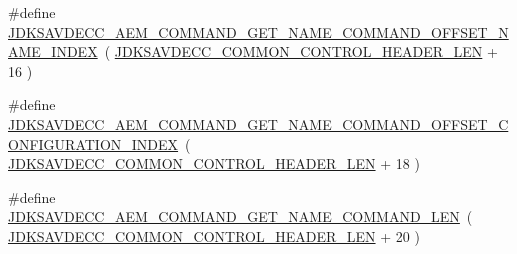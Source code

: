 \begin{DoxyCompactItemize}
\item 
\#define \hyperlink{group__command__get__name_gada0e8f56c3951ea4dc24a1279fe5b3f9}{J\+D\+K\+S\+A\+V\+D\+E\+C\+C\+\_\+\+A\+E\+M\+\_\+\+C\+O\+M\+M\+A\+N\+D\+\_\+\+G\+E\+T\+\_\+\+N\+A\+M\+E\+\_\+\+C\+O\+M\+M\+A\+N\+D\+\_\+\+O\+F\+F\+S\+E\+T\+\_\+\+N\+A\+M\+E\+\_\+\+I\+N\+D\+EX}~( \hyperlink{group__jdksavdecc__avtp__common__control__header_gaae84052886fb1bb42f3bc5f85b741dff}{J\+D\+K\+S\+A\+V\+D\+E\+C\+C\+\_\+\+C\+O\+M\+M\+O\+N\+\_\+\+C\+O\+N\+T\+R\+O\+L\+\_\+\+H\+E\+A\+D\+E\+R\+\_\+\+L\+EN} + 16 )
\item 
\#define \hyperlink{group__command__get__name_gacaa20b6280c941c43cfdd535adb8f61e}{J\+D\+K\+S\+A\+V\+D\+E\+C\+C\+\_\+\+A\+E\+M\+\_\+\+C\+O\+M\+M\+A\+N\+D\+\_\+\+G\+E\+T\+\_\+\+N\+A\+M\+E\+\_\+\+C\+O\+M\+M\+A\+N\+D\+\_\+\+O\+F\+F\+S\+E\+T\+\_\+\+C\+O\+N\+F\+I\+G\+U\+R\+A\+T\+I\+O\+N\+\_\+\+I\+N\+D\+EX}~( \hyperlink{group__jdksavdecc__avtp__common__control__header_gaae84052886fb1bb42f3bc5f85b741dff}{J\+D\+K\+S\+A\+V\+D\+E\+C\+C\+\_\+\+C\+O\+M\+M\+O\+N\+\_\+\+C\+O\+N\+T\+R\+O\+L\+\_\+\+H\+E\+A\+D\+E\+R\+\_\+\+L\+EN} + 18 )
\item 
\#define \hyperlink{group__command__get__name_ga12d8b1a1daf6c9b805a6d84f5ecf92cb}{J\+D\+K\+S\+A\+V\+D\+E\+C\+C\+\_\+\+A\+E\+M\+\_\+\+C\+O\+M\+M\+A\+N\+D\+\_\+\+G\+E\+T\+\_\+\+N\+A\+M\+E\+\_\+\+C\+O\+M\+M\+A\+N\+D\+\_\+\+L\+EN}~( \hyperlink{group__jdksavdecc__avtp__common__control__header_gaae84052886fb1bb42f3bc5f85b741dff}{J\+D\+K\+S\+A\+V\+D\+E\+C\+C\+\_\+\+C\+O\+M\+M\+O\+N\+\_\+\+C\+O\+N\+T\+R\+O\+L\+\_\+\+H\+E\+A\+D\+E\+R\+\_\+\+L\+EN} + 20 )
\end{DoxyCompactItemize}

